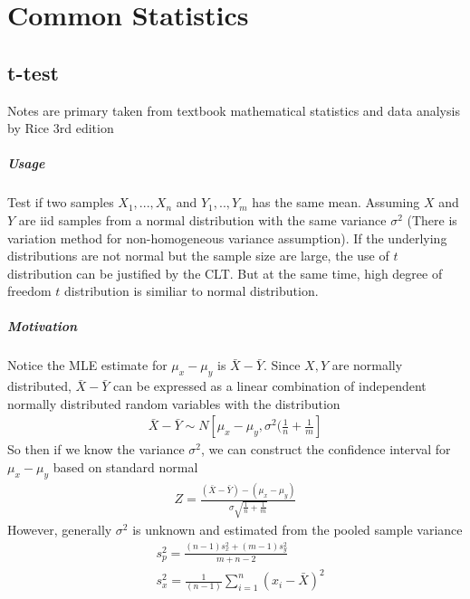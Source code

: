 \chapter{Common Statistics} 

\section{t-test}
Notes are primary taken from textbook mathematical statistics and data analysis by Rice 3rd edition 
\paragraph{Usage}
Test if two samples $X_1,...,X_n$ and $Y_1,..,Y_m$ has the same mean. Assuming $X$ and $Y$ are iid samples from a normal distribution with the same variance $\sigma^2$ (There is variation method for non-homogeneous variance assumption). If the underlying distributions are not normal but the sample size are large, the use of $t$ distribution can be justified by the CLT. But at the same time, high degree of freedom $t$ distribution is similiar to normal distribution. 

\paragraph{Motivation} Notice the MLE estimate for $\mu_x - \mu_y$ is $\bar{X} - \bar{Y}$. Since $X,Y$ are normally distributed, $\bar{X} - \bar{Y}$ can be expressed as a linear combination of independent normally distributed random variables with the distribution 
    \begin{align*}
        \bar{X} - \bar{Y} \sim N\left[ \mu_x - \mu_y, \sigma^2(\frac{1}{n} + \frac{1}{m} \right]
    \end{align*}
So then if we know the variance $\sigma^2$, we can construct the confidence interval for $\mu_x - \mu_y$ based on standard normal 
    \begin{align*}
        Z = \frac{(\bar{X} - \bar{Y}) - (\mu_x - \mu_y)}{\sigma \sqrt{\frac{1}{n} + \frac{1}{m}}}
    \end{align*}
However, generally $\sigma^2$ is unknown and estimated from the pooled sample variance 
    \begin{align*}
        & s_p^2 = \frac{(n-1)s_x^2 + (m-1)s_y^2}{m+n-2} \\
        & s_x^2 = \frac{1}{(n-1)}\sum_{i=1}^n (x_i - \bar{X})^2
    \end{align*}
    
